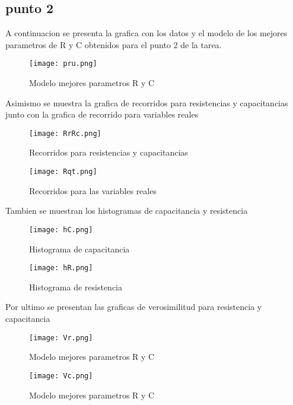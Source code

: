 ﻿\documentclass[notitlepage,letterpaper,12pt]{article}
\begin{document}
\subsection{punto 2}

A continuacion se presenta la grafica con los datos y el modelo de  los mejores parametros de R y C obtenidos para el punto 2 de la tarea.
\begin{figure}[h!]
  \centering
   \texttt{[image: pru.png]}
  \caption{Modelo mejores parametros R y C}
  \label{fig: cobre}
\end{figure}

\newpage


Asimismo se muestra la grafica de recorridos para resistencias y capacitancias junto con la grafica de recorrido para variables reales

\begin{figure}[h!]
  \centering
   \texttt{[image: RrRc.png]}
  \caption{Recorridos para resistencias y capacitancias}
  \label{fig: cobre}
\end{figure}

\begin{figure}[h!]
  \centering
   \texttt{[image: Rqt.png]}
  \caption{Recorridos para las variables reales}
  \label{fig: cobre}
\end{figure}

\newpage

Tambien se muestran los histogramas de capacitancia y resistencia

\begin{figure}[h!]
  \centering
   \texttt{[image: hC.png]}
  \caption{Histograma de capacitancia}
  \label{fig: cobre}
\end{figure}

\begin{figure}[h!]
  \centering
   \texttt{[image: hR.png]}
  \caption{Histograma de resistencia}
  \label{fig: cobre}
\end{figure}

\newpage 

Por ultimo se presentan las graficas de verosimilitud para resistencia y capacitancia

\begin{figure}[h!]
  \centering
   \texttt{[image: Vr.png]}
  \caption{Modelo mejores parametros R y C}
  \label{fig: cobre}
\end{figure}


\begin{figure}[h!]
  \centering
   \texttt{[image: Vc.png]}
  \caption{Modelo mejores parametros R y C}
  \label{fig: cobre}
\end{figure}
\end{document}
